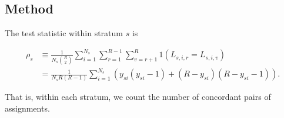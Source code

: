 \cite{davies1982measuring, mchugh2012interrater}

\subsection{Method}

The test statistic within stratum $s$ is

\begin{align*}
\rho_s &\equiv \frac{1}{N_s {R \choose 2}} \sum_{i=1}^{N_s}
              \sum_{r=1}^{R-1} \sum_{v=r+1}^R 1(L_{s,i,r} = L_{s,i,v}) \\
       &= \frac{1}{N_s R(R-1)} \sum_{i=1}^{N_s}
                (y_{si}(y_{si}-1) + (R-y_{si})(R-y_{si}-1)).
\end{align*}

That is, within each stratum, we count the number of concordant pairs of
assignments.

